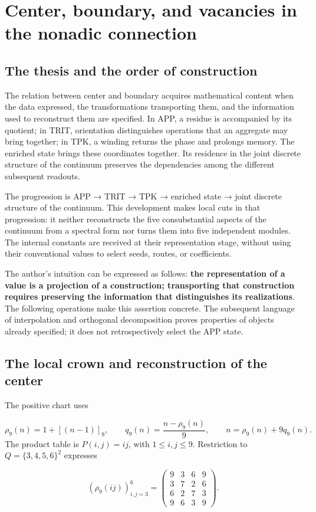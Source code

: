 \section{Center, boundary, and vacancies in the nonadic connection}
\label{sec:centro-frontera}
\subsection{The thesis and the order of construction}
The relation between center and boundary acquires mathematical content when the data expressed, the transformations transporting them, and the information used to reconstruct them are specified. In APP, a residue is accompanied by its quotient; in TRIT, orientation distinguishes operations that an aggregate may bring together; in TPK, a winding returns the phase and prolongs memory. The enriched state brings these coordinates together. Its residence in the joint discrete structure of the continuum preserves the dependencies among the different subsequent readouts.

The progression is APP → TRIT → TPK → enriched state → joint discrete structure of the continuum. This development makes local cuts in that progression: it neither reconstructs the five consubstantial aspects of the continuum from a spectral form nor turns them into five independent modules. The internal constants are received at their representation stage, without using their conventional values to select seeds, routes, or coefficients.

The author's intuition can be expressed as follows: \textbf{the representation of a value is a projection of a construction; transporting that construction requires preserving the information that distinguishes its realizations}. The following operations make this assertion concrete. The subsequent language of interpolation and orthogonal decomposition proves properties of objects already specified; it does not retrospectively select the APP state.

\subsection{The local crown and reconstruction of the center}
The positive chart uses

\[
\rho_9(n)=1+[(n-1)]_9,\qquad
q_9(n)=\frac{n-\rho_9(n)}9,
\qquad n=\rho_9(n)+9q_9(n).
\]
The product table is \(P(i,j)=ij\), with \(1\leq i,j\leq9\). Restriction to \(Q=\{3,4,5,6\}^2\) expresses

\[
\left(\rho_9(ij)\right)_{i,j=3}^{6}=
\begin{pmatrix}
9&3&6&9\\
3&7&2&6\\
6&2&7&3\\
9&6&3&9
\end{pmatrix}.
\]



